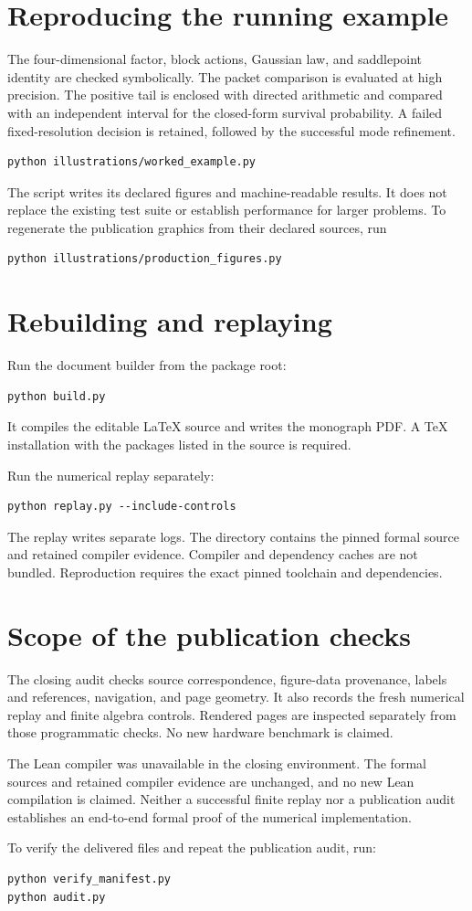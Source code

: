 \section{Reproducing the running example}
The four-dimensional factor, block actions, Gaussian law, and saddlepoint identity are checked symbolically. The packet comparison is evaluated at high precision. The positive tail is enclosed with directed arithmetic and compared with an independent interval for the closed-form survival probability. A failed fixed-resolution decision is retained, followed by the successful mode refinement.
\begin{lstlisting}
python illustrations/worked_example.py
\end{lstlisting}
The script writes its declared figures and machine-readable results. It does not replace the existing test suite or establish performance for larger problems. To regenerate the publication graphics from their declared sources, run
\begin{lstlisting}
python illustrations/production_figures.py
\end{lstlisting}

\section{Rebuilding and replaying}
Run the document builder from the package root:
\begin{lstlisting}
python build.py
\end{lstlisting}
It compiles the editable LaTeX source and writes the monograph PDF. A TeX
installation with the packages listed in the source is required.

Run the numerical replay separately:
\begin{lstlisting}
python replay.py --include-controls
\end{lstlisting}
The replay writes separate logs. The  directory contains the pinned formal source and retained compiler evidence. Compiler and dependency caches are not bundled. Reproduction requires the exact pinned toolchain and dependencies.

\section{Scope of the publication checks}
The closing audit checks source correspondence, figure-data provenance,
labels and references, navigation, and page geometry. It also records the
fresh numerical replay and finite algebra controls. Rendered pages are
inspected separately from those programmatic checks. No new hardware
benchmark is claimed.

The Lean compiler was unavailable in the closing environment. The formal
sources and retained compiler evidence are unchanged, and no new Lean
compilation is claimed. Neither a successful finite replay nor a publication
audit establishes an end-to-end formal proof of the numerical implementation.

To verify the delivered files and repeat the publication audit, run:
\begin{lstlisting}
python verify_manifest.py
python audit.py
\end{lstlisting}
